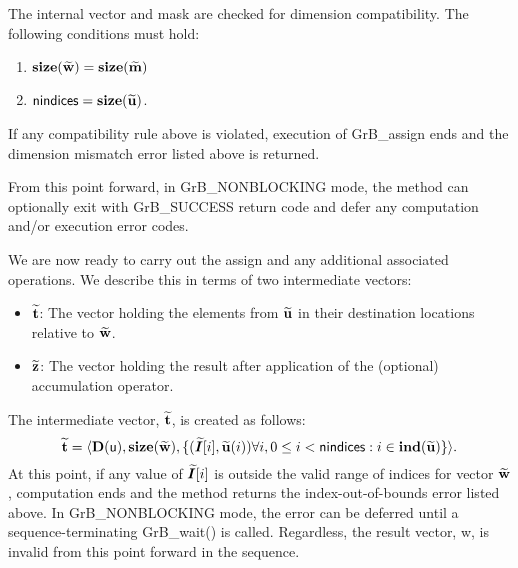 The internal vector and mask are checked for dimension compatibility. 
The following conditions must hold:
\begin{enumerate}
    \item $\bold{size}({\bf \widetilde{w}}) = \bold{size}({\bf \widetilde{m}})$
    \item ${\sf nindices} = \bold{size}({\bf \widetilde{u}})$.
\end{enumerate}
If any compatibility rule above is violated, execution of {\sf GrB\_assign} ends and 
the dimension mismatch error listed above is returned.

From this point forward, in {\sf GrB\_NONBLOCKING} mode, the method can 
optionally exit with {\sf GrB\_SUCCESS} return code and defer any computation 
and/or execution error codes.

We are now ready to carry out the assign and any additional 
associated operations.  We describe this in terms of two intermediate vectors:
\begin{itemize}
    \item ${\bf \widetilde{t}}$: The vector holding the elements from
    ${\bf \widetilde{u}}$ in their destination locations relative to 
    ${\bf \widetilde{w}}$.

    \item ${\bf \widetilde{z}}$: The vector holding the result after 
    application of the (optional) accumulation operator.
\end{itemize}

The intermediate vector, ${\bf \widetilde{t}}$, is created as follows:
\[
{\bf \widetilde{t}} = \langle
\bold{D}({\sf u}), \bold{size}({\bf \widetilde{w}}),
\{(\bm{\widetilde{I}}[i],{\bf \widetilde{u}}(i)) \forall i, 0 \leq i < {\sf nindices} : 
i \in \bold{ind}({\bf \widetilde{u}}) \} \rangle. 
\]
At this point, if any value of $\bm{\widetilde{I}}[i]$ is outside the valid
range of indices for vector ${\bf \widetilde{w}}$, computation ends and the 
method returns the index-out-of-bounds error listed above. In 
{\sf GrB\_NONBLOCKING} mode, the error can be deferred until a 
sequence-terminating {\sf GrB\_wait()} is called.  Regardless, the result 
vector, {\sf w}, is invalid from this point forward in the 
sequence.

